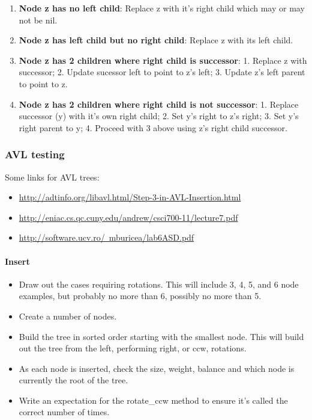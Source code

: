 \documentclass{article}
\begin{document}
\begin{enumerate}
  \item \textbf{Node z has no left child}: Replace z with it's right child
    which may or may not be nil.
  \item \textbf{Node z has left child but no right child}: Replace z with
    its left child.
  \item \textbf{Node z has 2 children where right child is successor}: 1.
    Replace z with successor; 2. Update sucessor left to point to z's left;
    3. Update z's left parent to point to z.
  \item \textbf{Node z has 2 children where right child is not successor}:
    1. Replace successor (y) with it's own right child; 2. Set y's right to
    z's right; 3. Set y's right parent to y; 4. Proceed with 3 above using
    z's right child successor.
\end{enumerate}


\subsubsection{AVL testing}

Some links for AVL trees:

\begin{itemize}
\item  \href{http://adtinfo.org/libavl.html/Step-3-in-AVL-Insertion.html}{%
http://adtinfo.org/libavl.html/Step-3-in-AVL-Insertion.html}
\item \href{http://eniac.cs.qc.cuny.edu/andrew/csci700-11/lecture7.pdf}{%
http://eniac.cs.qc.cuny.edu/andrew/csci700-11/lecture7.pdf}
\item \href{http://software.ucv.ro/~mburicea/lab6ASD.pdf}{%
http://software.ucv.ro/~mburicea/lab6ASD.pdf}
\end{itemize}

\paragraph{Insert}

\begin{itemize}
\item Draw out the cases requiring rotations. This will include 3, 4, 5, and 6
node examples, but probably no more than 6, possibly no more than 5.
\item Create a number of nodes.
\item Build the tree in sorted order starting with the smallest node.
This will build out the tree from the left, performing right, or ccw, rotations.
\item As each node is inserted, check the size, weight, balance and which node is currently the root of the tree.
\item Write an expectation for the rotate\_ccw method to ensure it's called the correct number of times.
\end{itemize}
\end{document}
